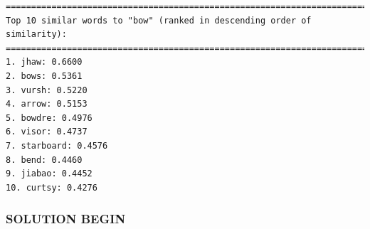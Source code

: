 \documentclass[11pt]{article}
\begin{document}
    \begin{Verbatim}[commandchars=\\\{\}]
===========================================================================
Top 10 similar words to "bow" (ranked in descending order of similarity):
===========================================================================
1. jhaw: 0.6600
2. bows: 0.5361
3. vursh: 0.5220
4. arrow: 0.5153
5. bowdre: 0.4976
6. visor: 0.4737
7. starboard: 0.4576
8. bend: 0.4460
9. jiabao: 0.4452
10. curtsy: 0.4276
    \end{Verbatim}

    \hypertarget{solution-begin}{%
\subsubsection{SOLUTION BEGIN}\label{solution-begin}}
\end{document}
